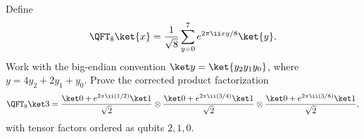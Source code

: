 Define
$$
    \QFT_8\ket{x}=\frac1{\sqrt8}\sum_{y=0}^7 e^{2\pi\ii xy/8}\ket{y}.
$$
Work with the big-endian convention $\ket y=\ket{y_2y_1y_0}$, where $y=4y_2+2y_1+y_0$.  Prove the corrected product factorization
$$
    \QFT_8\ket3=
    \frac{\ket0+e^{2\pi\ii(1/2)}\ket1}{\sqrt2}
    \otimes
    \frac{\ket0+e^{2\pi\ii(3/4)}\ket1}{\sqrt2}
    \otimes
    \frac{\ket0+e^{2\pi\ii(3/8)}\ket1}{\sqrt2},
$$
with tensor factors ordered as qubits $2,1,0$.
